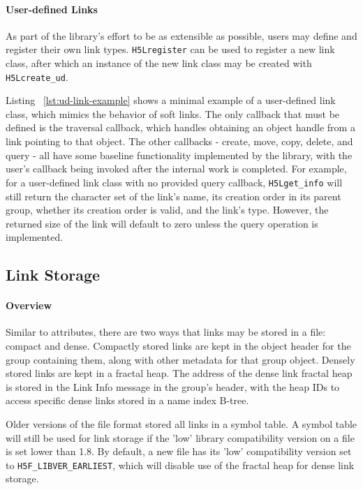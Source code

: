 \paragraph{User-defined Links} As part of the library's effort to be as extensible as possible, users may define and register their own link types. \texttt{H5Lregister} can be used to register a new link class, after which an instance of the new link class may be created with \texttt{H5Lcreate\_ud}.  

Listing ~\ref{lst:ud-link-example} shows a minimal example of a user-defined link class, which mimics the behavior of soft links. The only callback that must be defined is the traversal callback, which handles obtaining an object handle from a link pointing to that object. The other callbacks - create, move, copy, delete, and query - all have some baseline functionality implemented by the library, with the user's callback being invoked after the internal work is completed. For example, for a user-defined link class with no provided query callback, \texttt{H5Lget\_info} will still return the character set of the link's name, its creation order in its parent group, whether its creation order is valid, and the link's type. However, the returned size of the link will default to zero unless the query operation is implemented.

\subsection{Link Storage}

\paragraph{Overview}  Similar to attributes, there are two ways that links may be stored in a file: compact and dense. Compactly stored links are kept in the object header for the group containing them, along with other metadata for that group object. Densely stored links are kept in a fractal heap. The address of the dense link fractal heap is stored in the Link Info message in the group's header, with the heap IDs to access specific dense links stored in a name index B-tree.

Older versions of the file format stored all links in a symbol table. A symbol table will still be used for link storage if the 'low' library compatibility version on a file is set lower than 1.8. By default, a new file has its 'low' compatibility version set to \texttt{H5F\_LIBVER\_EARLIEST}, which will disable use of the fractal heap for dense link storage.

